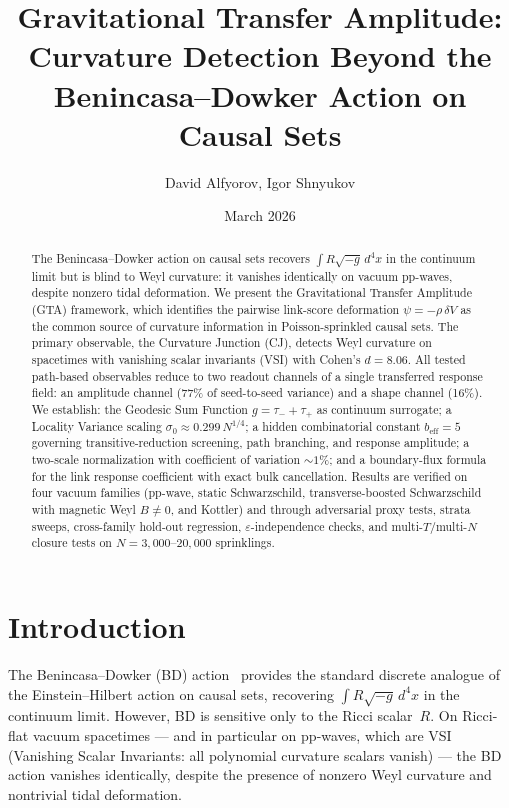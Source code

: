 \documentclass[12pt,a4paper]{article}
\title{Gravitational Transfer Amplitude:\\
Curvature Detection Beyond the Benincasa--Dowker Action on Causal Sets}
\author{David Alfyorov, Igor Shnyukov}
\date{March 2026}
\begin{document}
\maketitle

\begin{abstract}
The Benincasa--Dowker action on causal sets recovers $\int R\sqrt{-g}\,d^4x$ in the continuum limit but is blind to Weyl curvature: it vanishes identically on vacuum pp-waves, despite nonzero tidal deformation. We present the Gravitational Transfer Amplitude (GTA) framework, which identifies the pairwise link-score deformation $\psi = -\rho\,\delta V$ as the common source of curvature information in Poisson-sprinkled causal sets. The primary observable, the Curvature Junction (CJ), detects Weyl curvature on spacetimes with vanishing scalar invariants (VSI) with Cohen's $d = 8.06$. All tested path-based observables reduce to two readout channels of a single transferred response field: an amplitude channel (77\% of seed-to-seed variance) and a shape channel (16\%). We establish: the Geodesic Sum Function $g = \tau_- + \tau_+$ as continuum surrogate; a Locality Variance scaling $\sigma_0 \approx 0.299\,N^{1/4}$; a hidden combinatorial constant $b_{\mathrm{eff}} = 5$ governing transitive-reduction screening, path branching, and response amplitude; a two-scale normalization with coefficient of variation $\sim\!1\%$; and a boundary-flux formula for the link response coefficient with exact bulk cancellation. Results are verified on four vacuum families (pp-wave, static Schwarzschild, transverse-boosted Schwarzschild with magnetic Weyl $B \neq 0$, and Kottler) and through adversarial proxy tests, strata sweeps, cross-family hold-out regression, $\varepsilon$-independence checks, and multi-$T$/multi-$N$ closure tests on $N = 3{,}000$--$20{,}000$ sprinklings.
\end{abstract}

\tableofcontents

\section{Introduction}

The Benincasa--Dowker (BD) action~\cite{BD2010} provides the standard discrete analogue of the Einstein--Hilbert action on causal sets, recovering $\int R\sqrt{-g}\,d^4x$ in the continuum limit. However, BD is sensitive only to the Ricci scalar~$R$. On Ricci-flat vacuum spacetimes --- and in particular on pp-waves, which are VSI (Vanishing Scalar Invariants: all polynomial curvature scalars vanish) --- the BD action vanishes identically, despite the presence of nonzero Weyl curvature and nontrivial tidal deformation.
\end{document}
